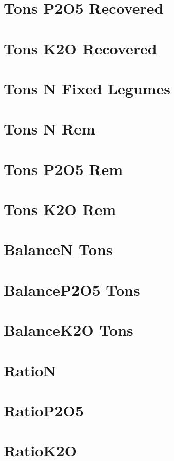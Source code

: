 \documentclass{report}
\begin{document}
\section*{Tons P2O5 Recovered}

\section*{Tons K2O Recovered}

\section*{Tons N Fixed Legumes}

\section*{Tons N Rem}

\section*{Tons P2O5 Rem}

\section*{Tons K2O Rem}

\section*{BalanceN Tons}

\section*{BalanceP2O5 Tons}

\section*{BalanceK2O Tons}

\section*{RatioN}

\section*{RatioP2O5}

\section*{RatioK2O}
\end{document}
